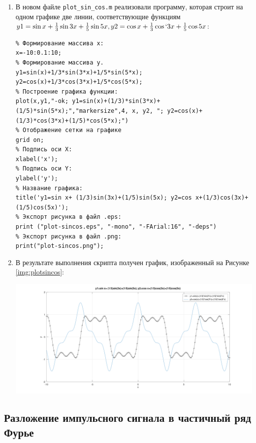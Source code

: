 \begin{enumerate}
    \item В новом файле \texttt{plot\_sin\_cos.m} реализовали программу, которая строит
        на одном графике две линии, соответствующие функциям \(y1 = \sin{x} + \frac{1}{3} \sin{3x} + \frac{1}{5} \sin{5x}, y2 = \cos{x} + \frac{1}{3} \cos`{3x} + \frac{1}{5} \cos{5x}\):
        \begin{verbatim}
% Формирование массива x:
x=-10:0.1:10;
% Формирование массива y.
y1=sin(x)+1/3*sin(3*x)+1/5*sin(5*x);
y2=cos(x)+1/3*cos(3*x)+1/5*cos(5*x);
% Построение графика функции:
plot(x,y1,"-ok; y1=sin(x)+(1/3)*sin(3*x)+(1/5)*sin(5*x);","markersize",4, x, y2, "; y2=cos(x)+(1/3)*cos(3*x)+(1/5)*cos(5*x);")
% Отображение сетки на графике
grid on;
% Подпись оси X:
xlabel('x');
% Подпись оси Y:
ylabel('y');
% Название графика:
title('y1=sin x+ (1/3)sin(3x)+(1/5)sin(5x); y2=cos x+(1/3)cos(3x)+(1/5)cos(5x)');
% Экспорт рисунка в файл .eps:
print ("plot-sincos.eps", "-mono", "-FArial:16", "-deps")
% Экспорт рисунка в файл .png:
print("plot-sincos.png");
        \end{verbatim}

    \item В результате выполнения скрипта получен график, изображенный на Рисунке \ref{img:plotsincos}:
        \begin{center}
            \centering
            \includegraphics[width=\textwidth]{../octave/plot-sincos.png}
            \label{img:plotsincos}
        \end{center}
\end{enumerate}

\subsection{Разложение импульсного сигнала в частичный ряд Фурье}

